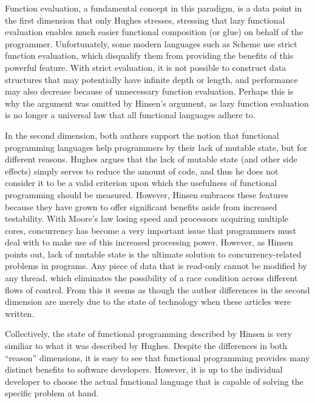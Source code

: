 \documentclass[12pt,letterpaper]{article}
\begin{document}
Function evaluation, a fundamental concept in this paradigm, is a data point in the first dimension that only Hughes stresses, stressing that lazy functional
evaluation enables much easier functional composition (or glue) on behalf of the programmer. Unfortunately, some modern
languages such as Scheme use strict function evaluation, which disqualify them from providing the benefits
of this powerful feature. With strict evaluation, it is not possible to construct data structures that may potentially
have infinite depth or length, and performance may also decrease because of unnecessary function evaluation. 
Perhaps this is why the argument was omitted by Hinsen's argument, as lazy function evaluation is no longer a universal
law that all functional languages adhere to. 

In the second dimension, both authors support the notion that functional programming languages help programmers
by their lack of mutable state, but for different reasons. Hughes argues that the lack of mutable state (and other side effects)
simply serves to reduce the amount of code, and thus he does not consider it to be a valid criterion upon which 
the usefulness of functional programming should be measured. 
However, Hinsen embraces these features because they have grown to offer significant benefits aside from increased
testability. With Moore's law losing speed and processors acquiring multiple cores, concurrency has become a
very important issue that programmers must deal with to make use of this increased processing power. However,
as Hinsen points out, lack of mutable state is the ultimate solution to concurrency-related problems in programs. 
Any piece of data that is read-only cannot be modified by any thread, which eliminates the possibility of 
a race condition across different flows of control. From this it seems as though the author differences in the second 
dimension are merely due to the state of technology when these articles were written. 

Collectively, the state of functional programming described by Hinsen is very similiar to what it was described by
Hughes. Despite the differences in both ``reason'' dimensions, it is easy to see that functional programming 
provides many distinct benefits to software developers. However, it is up to the individual developer to choose
the actual functional language that is capable of solving the specific problem at hand. 



\end{document}
